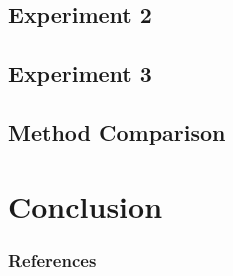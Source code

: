 \documentclass[10pt]{beamer}
\begin{document}
\subsection{Experiment 2}

\subsection{Experiment 3}

\subsection{Method Comparison}

%

\section{Conclusion}
%
%


\begin{frame}[allowframebreaks]
  \frametitle{References}
  
  {\footnotesize  }
\end{frame}

\end{document}
